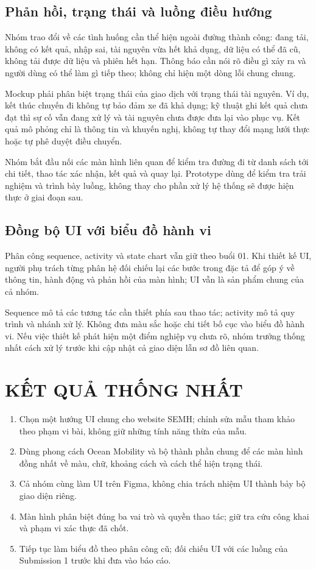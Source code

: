 \documentclass[10pt,a4paper]{article}
\begin{document}
\subsection{Phản hồi, trạng thái và luồng điều hướng}
Nhóm trao đổi về các tình huống cần thể hiện ngoài đường thành công: đang tải, không có kết quả, nhập sai, tài nguyên vừa hết khả dụng, dữ liệu có thể đã cũ, không tải được dữ liệu và phiên hết hạn. Thông báo cần nói rõ điều gì xảy ra và người dùng có thể làm gì tiếp theo; không chỉ hiện một dòng lỗi chung chung.

Mockup phải phân biệt trạng thái của giao dịch với trạng thái tài nguyên. Ví dụ, kết thúc chuyến đi không tự bảo đảm xe đã khả dụng; kỹ thuật ghi kết quả chưa đạt thì sự cố vẫn đang xử lý và tài nguyên chưa được đưa lại vào phục vụ. Kết quả mô phỏng chỉ là thông tin và khuyến nghị, không tự thay đổi mạng lưới thực hoặc tự phê duyệt điều chuyển.

Nhóm bắt đầu nối các màn hình liên quan để kiểm tra đường đi từ danh sách tới chi tiết, thao tác xác nhận, kết quả và quay lại. Prototype dùng để kiểm tra trải nghiệm và trình bày luồng, không thay cho phần xử lý hệ thống sẽ được hiện thực ở giai đoạn sau.

\subsection{Đồng bộ UI với biểu đồ hành vi}
Phân công sequence, activity và state chart vẫn giữ theo buổi 01. Khi thiết kế UI, người phụ trách từng phân hệ đối chiếu lại các bước trong đặc tả để góp ý về thông tin, hành động và phản hồi của màn hình; UI vẫn là sản phẩm chung của cả nhóm.

Sequence mô tả các tương tác cần thiết phía sau thao tác; activity mô tả quy trình và nhánh xử lý. Không đưa màu sắc hoặc chi tiết bố cục vào biểu đồ hành vi. Nếu việc thiết kế phát hiện một điểm nghiệp vụ chưa rõ, nhóm trưởng thống nhất cách xử lý trước khi cập nhật cả giao diện lẫn sơ đồ liên quan.

\section{KẾT QUẢ THỐNG NHẤT}
\begin{enumerate}
  \item Chọn một hướng UI chung cho website SEMH; chỉnh sửa mẫu tham khảo theo phạm vi bài, không giữ những tính năng thừa của mẫu.
  \item Dùng phong cách Ocean Mobility và bộ thành phần chung để các màn hình đồng nhất về màu, chữ, khoảng cách và cách thể hiện trạng thái.
  \item Cả nhóm cùng làm UI trên Figma, không chia trách nhiệm UI thành bảy bộ giao diện riêng.
  \item Màn hình phân biệt đúng ba vai trò và quyền thao tác; giữ tra cứu công khai và phạm vi xác thực đã chốt.
  \item Tiếp tục làm biểu đồ theo phân công cũ; đối chiếu UI với các luồng của Submission 1 trước khi đưa vào báo cáo.
\end{enumerate}
\end{document}
